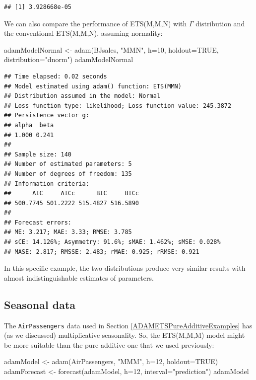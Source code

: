 \documentclass[
]{book}
\newenvironment{Shaded}{\begin{snugshade}}{\end{snugshade}}
\newcommand{\AttributeTok}[1]{\textcolor[rgb]{0.77,0.63,0.00}{#1}}
\newcommand{\ConstantTok}[1]{\textcolor[rgb]{0.00,0.00,0.00}{#1}}
\newcommand{\DecValTok}[1]{\textcolor[rgb]{0.00,0.00,0.81}{#1}}
\newcommand{\FunctionTok}[1]{\textcolor[rgb]{0.00,0.00,0.00}{#1}}
\newcommand{\NormalTok}[1]{#1}
\newcommand{\OtherTok}[1]{\textcolor[rgb]{0.56,0.35,0.01}{#1}}
\newcommand{\StringTok}[1]{\textcolor[rgb]{0.31,0.60,0.02}{#1}}
\theoremstyle{definition}
\theoremstyle{definition}
\theoremstyle{definition}
\theoremstyle{definition}
\theoremstyle{remark}
\begin{document}
\begin{verbatim}
## [1] 3.928668e-05
\end{verbatim}

We can also compare the performance of ETS(M,M,N) with \(\Gamma\) distribution and the conventional ETS(M,M,N), assuming normality:

\begin{Shaded}
\begin{Highlighting}[]
\NormalTok{adamModelNormal }\OtherTok{\textless{}{-}} \FunctionTok{adam}\NormalTok{(BJsales, }\StringTok{"MMN"}\NormalTok{, }\AttributeTok{h=}\DecValTok{10}\NormalTok{, }\AttributeTok{holdout=}\ConstantTok{TRUE}\NormalTok{,}
                        \AttributeTok{distribution=}\StringTok{"dnorm"}\NormalTok{)}
\NormalTok{adamModelNormal}
\end{Highlighting}
\end{Shaded}

\begin{verbatim}
## Time elapsed: 0.02 seconds
## Model estimated using adam() function: ETS(MMN)
## Distribution assumed in the model: Normal
## Loss function type: likelihood; Loss function value: 245.3872
## Persistence vector g:
## alpha  beta 
## 1.000 0.241 
## 
## Sample size: 140
## Number of estimated parameters: 5
## Number of degrees of freedom: 135
## Information criteria:
##      AIC     AICc      BIC     BICc 
## 500.7745 501.2222 515.4827 516.5890 
## 
## Forecast errors:
## ME: 3.217; MAE: 3.33; RMSE: 3.785
## sCE: 14.126%; Asymmetry: 91.6%; sMAE: 1.462%; sMSE: 0.028%
## MASE: 2.817; RMSSE: 2.483; rMAE: 0.925; rRMSE: 0.921
\end{verbatim}

In this specific example, the two distributions produce very similar results with almost indistinguishable estimates of parameters.

\hypertarget{seasonal-data}{%
\subsection{Seasonal data}\label{seasonal-data}}

The \texttt{AirPassengers} data used in Section \ref{ADAMETSPureAdditiveExamples} has (as we discussed) multiplicative seasonality. So, the ETS(M,M,M) model might be more suitable than the pure additive one that we used previously:

\begin{Shaded}
\begin{Highlighting}[]
\NormalTok{adamModel }\OtherTok{\textless{}{-}} \FunctionTok{adam}\NormalTok{(AirPassengers, }\StringTok{"MMM"}\NormalTok{, }\AttributeTok{h=}\DecValTok{12}\NormalTok{, }\AttributeTok{holdout=}\ConstantTok{TRUE}\NormalTok{)}
\NormalTok{adamForecast }\OtherTok{\textless{}{-}} \FunctionTok{forecast}\NormalTok{(adamModel, }\AttributeTok{h=}\DecValTok{12}\NormalTok{, }\AttributeTok{interval=}\StringTok{"prediction"}\NormalTok{)}
\NormalTok{adamModel}
\end{Highlighting}
\end{Shaded}
\end{document}
